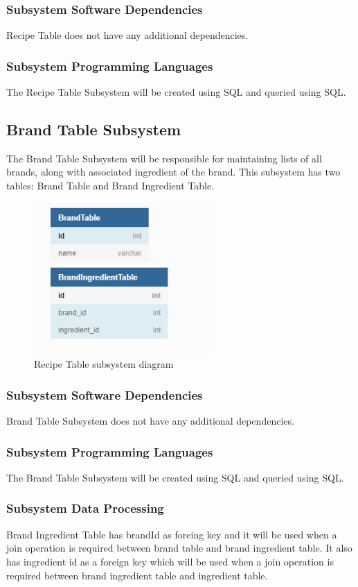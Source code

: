 \subsubsection{Subsystem Software Dependencies}
Recipe Table does not have any additional dependencies.

\subsubsection{Subsystem Programming Languages}
The Recipe Table Subsystem will be created using SQL and queried using SQL.

\subsection{Brand Table Subsystem}
The Brand Table Subsystem will be responsible for maintaining lists of all brands, along with associated ingredient of the brand. This subsystem has two tables: Brand Table and Brand Ingredient Table.

\begin{figure}[h!]
	\centering
 	\includegraphics[width=0.60\textwidth]{images/Brand_Table.png}
 \caption{Recipe Table subsystem diagram}
\end{figure}

\subsubsection{Subsystem Software Dependencies}
Brand Table Subsystem does not have any additional dependencies.

\subsubsection{Subsystem Programming Languages}
The Brand Table Subsystem will be created using SQL and queried using SQL.

\subsubsection{Subsystem Data Processing}
Brand Ingredient Table has brandId as foreing key and it will be used when a join operation is required between brand table and brand ingredient table. It also has ingredient id as a foreign key which will be used when a join operation is required between brand ingredient table and ingredient table.